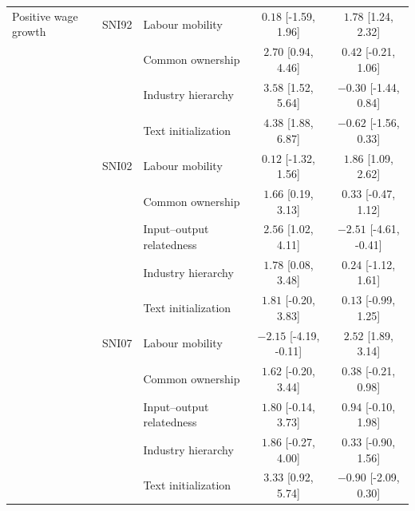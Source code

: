 \begin{table}[htbp]
\begin{tabular}{lllcc}
\midrule
Positive wage growth & SNI92 & Labour mobility & $0.18$ [-1.59, 1.96] & $1.78$ [1.24, 2.32] \\
 &  & Common ownership & $2.70$ [0.94, 4.46] & $0.42$ [-0.21, 1.06] \\
 &  & Industry hierarchy & $3.58$ [1.52, 5.64] & $-0.30$ [-1.44, 0.84] \\
 &  & Text initialization & $4.38$ [1.88, 6.87] & $-0.62$ [-1.56, 0.33] \\
\addlinespace[2pt]
 & SNI02 & Labour mobility & $0.12$ [-1.32, 1.56] & $1.86$ [1.09, 2.62] \\
 &  & Common ownership & $1.66$ [0.19, 3.13] & $0.33$ [-0.47, 1.12] \\
 &  & Input--output relatedness & $2.56$ [1.02, 4.11] & $-2.51$ [-4.61, -0.41] \\
 &  & Industry hierarchy & $1.78$ [0.08, 3.48] & $0.24$ [-1.12, 1.61] \\
 &  & Text initialization & $1.81$ [-0.20, 3.83] & $0.13$ [-0.99, 1.25] \\
\addlinespace[2pt]
 & SNI07 & Labour mobility & $-2.15$ [-4.19, -0.11] & $2.52$ [1.89, 3.14] \\
 &  & Common ownership & $1.62$ [-0.20, 3.44] & $0.38$ [-0.21, 0.98] \\
 &  & Input--output relatedness & $1.80$ [-0.14, 3.73] & $0.94$ [-0.10, 1.98] \\
 &  & Industry hierarchy & $1.86$ [-0.27, 4.00] & $0.33$ [-0.90, 1.56] \\
 &  & Text initialization & $3.33$ [0.92, 5.74] & $-0.90$ [-2.09, 0.30] \\
\bottomrule
\end{tabular}
\end{table}

